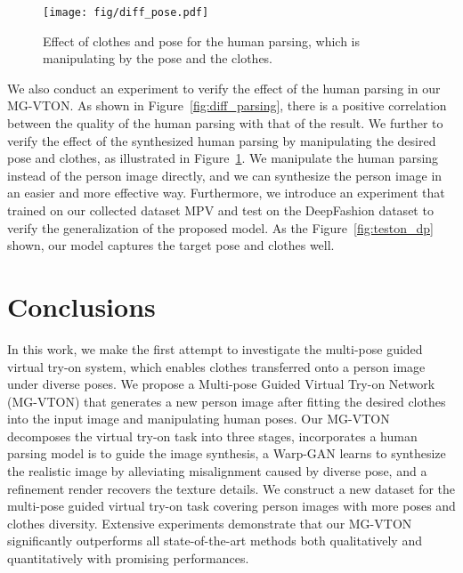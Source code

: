 \documentclass[10pt,twocolumn,letterpaper]{article}
\begin{document}
\begin{figure}[!tp]
\centering
\texttt{[image: fig/diff\_pose.pdf]} 
\caption{Effect of clothes and pose for the human parsing, which is manipulating by the pose and the clothes. }
\label{fig:diff_pose}
\vspace{-4mm}
\end{figure}

We also conduct an experiment to verify the effect of the human parsing in our MG-VTON. As shown in Figure~\ref{fig:diff_parsing}, there is a positive correlation between the quality of the human parsing with that of the result. We further to verify the effect of the synthesized human parsing by manipulating the desired pose and clothes, as illustrated in Figure~\ref{fig:diff_pose}. 
We manipulate the human parsing instead of the person image directly, and we can synthesize the person image in an easier and more effective way. Furthermore, we introduce an experiment that trained on our collected dataset MPV and test on the DeepFashion dataset to verify the generalization of the proposed model. As the Figure~\ref{fig:teston_dp} shown, our model captures the target pose and clothes well.







\section{Conclusions}
In this work, we make the first attempt to investigate the multi-pose guided virtual try-on system, which enables clothes transferred onto a person image under diverse poses. We propose a Multi-pose Guided Virtual Try-on Network (MG-VTON) that generates a new person image after fitting the desired clothes into the input image and manipulating human poses. Our MG-VTON decomposes the virtual try-on task into three stages, incorporates a human parsing model is to guide the image synthesis, a Warp-GAN learns to synthesize the realistic image by alleviating misalignment caused by diverse pose, and a refinement render recovers the texture details. We construct a new dataset for the multi-pose guided virtual try-on task covering person images with more poses and clothes diversity. Extensive experiments demonstrate that our MG-VTON significantly outperforms all state-of-the-art methods both qualitatively and quantitatively with promising performances.
\end{document}
